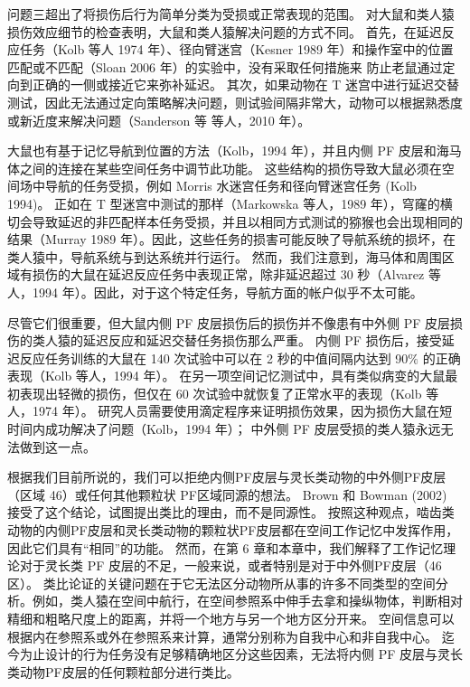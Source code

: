 \par 
问题三超出了将损伤后行为简单分类为受损或正常表现的范围。 对大鼠和类人猿损伤效应细节的检查表明，大鼠和类人猿解决问题的方式不同。 首先，在延迟反应任务（Kolb 等人 1974 年）、径向臂迷宫（Kesner 1989 年）和操作室中的位置匹配或不匹配（Sloan  2006 年）的实验中，没有采取任何措施来 防止老鼠通过定向到正确的一侧或接近它来弥补延迟。 其次，如果动物在 T 迷宫中进行延迟交替测试，因此无法通过定向策略解决问题，则试验间隔非常大，动物可以根据熟悉度或新近度来解决问题（Sanderson 等 等人，2010 年）。
\par 
大鼠也有基于记忆导航到位置的方法（Kolb，1994 年），并且内侧 PF 皮层和海马体之间的连接在某些空间任务中调节此功能。 这些结构的损伤导致大鼠必须在空间场中导航的任务受损，例如 Morris 水迷宫任务和径向臂迷宫任务 (Kolb 1994)。 正如在 T 型迷宫中测试的那样（Markowska 等人，1989 年），穹窿的横切会导致延迟的非匹配样本任务受损，并且以相同方式测试的猕猴也会出现相同的结果（Murray 1989 年）。因此，这些任务的损害可能反映了导航系统的损坏，在类人猿中，导航系统与到达系统并行运行。 然而，我们注意到，海马体和周围区域有损伤的大鼠在延迟反应任务中表现正常，除非延迟超过 30 秒（Alvarez 等人，1994 年）。因此，对于这个特定任务，导航方面的帐户似乎不太可能。
\par 
尽管它们很重要，但大鼠内侧 PF 皮层损伤后的损伤并不像患有中外侧 PF 皮层损伤的类人猿的延迟反应和延迟交替任务损伤那么严重。 内侧 PF 损伤后，接受延迟反应任务训练的大鼠在 140 次试验中可以在 2 秒的中值间隔内达到 90$\%$ 的正确表现（Kolb 等人，1994 年）。 在另一项空间记忆测试中，具有类似病变的大鼠最初表现出轻微的损伤，但仅在 60 次试验中就恢复了正常水平的表现（Kolb 等人，1974 年）。 研究人员需要使用滴定程序来证明损伤效果，因为损伤大鼠在短时间内成功解决了问题（Kolb，1994 年）； 中外侧 PF 皮层受损的类人猿永远无法做到这一点。
\par 
根据我们目前所说的，我们可以拒绝内侧PF皮层与灵长类动物的中外侧PF皮层（区域 46）或任何其他颗粒状 PF区域同源的想法。 Brown 和 Bowman (2002) 接受了这个结论，试图提出类比的理由，而不是同源性。 按照这种观点，啮齿类动物的内侧PF皮层和灵长类动物的颗粒状PF皮层都在空间工作记忆中发挥作用，因此它们具有“相同”的功能。 然而，在第 6 章和本章中，我们解释了工作记忆理论对于灵长类 PF 皮层的不足，一般来说，或者特别是对于中外侧PF皮层（46 区）。 类比论证的关键问题在于它无法区分动物所从事的许多不同类型的空间分析。例如，类人猿在空间中航行，在空间参照系中伸手去拿和操纵物体，判断相对 精细和粗略尺度上的距离，并将一个地方与另一个地方区分开来。 空间信息可以根据内在参照系或外在参照系来计算，通常分别称为自我中心和非自我中心。 迄今为止设计的行为任务没有足够精确地区分这些因素，无法将内侧 PF 皮层与灵长类动物PF皮层的任何颗粒部分进行类比。

